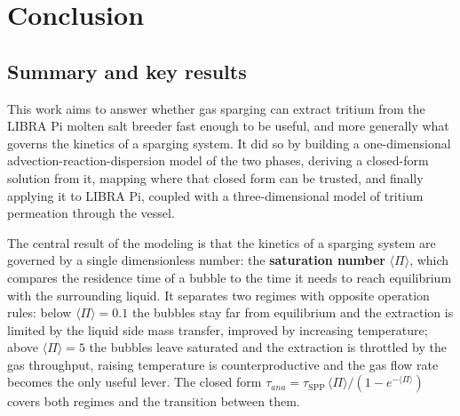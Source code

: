 \documentclass[a4paper,11pt,oneside]{report}
\begin{document}




\chapter{Conclusion}


\section{Summary and key results}
This work aims to answer whether gas sparging can extract tritium from the LIBRA Pi molten salt breeder fast enough to be useful, and more generally what governs the kinetics of a sparging system. It did so by building a one-dimensional advection-reaction-dispersion model of the two phases, deriving a closed-form solution from it, mapping where that closed form can be trusted, and finally applying it to LIBRA Pi, coupled with a three-dimensional model of tritium permeation through the vessel.

The central result of the modeling is that the kinetics of a sparging system are governed by a single dimensionless number: the \textbf{saturation number} $\langle\Pi\rangle$, which compares the residence time of a bubble to the time it needs to reach equilibrium with the surrounding liquid. It separates two regimes with opposite operation rules: below $\langle\Pi\rangle=0.1$ the bubbles stay far from equilibrium and the extraction is limited by the liquid side mass transfer, improved by increasing temperature; above $\langle\Pi\rangle=5$ the bubbles leave saturated and the extraction is throttled by the gas throughput, raising temperature is counterproductive and the gas flow rate becomes the only useful lever. The closed form $\tau_{ana}=\tau_\mathrm{SPP}\,\langle\Pi\rangle/(1-e^{-\langle\Pi\rangle})$ covers both regimes and the transition between them.
\end{document}
